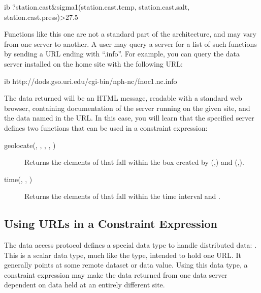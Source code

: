 \begin{vcode}{ib}
?station.cast&sigma1(station.cast.temp,
                     station.cast.salt,
                     station.cast.press)>27.5
\end{vcode}

 
  
 
Functions like this one are not a standard part of the \opendap
architecture, and may vary from one server to another.  A user may
query a server for a list of such functions by sending a URL ending with
``.info''. For example, you can query the data server installed on the
\opendap home site with the following URL:

\begin{vcode}{ib}
  http://dods.gso.uri.edu/cgi-bin/nph-nc/fnoc1.nc.info
\end{vcode}
\label{opd-client,usage}

The data returned will be an HTML message, readable with a standard
web browser, containing documentation of the server running on the
given site, and the data named in the URL.  In this case, you will
learn that the specified server defines two functions that can be used
in a constraint expression: 

\begin{description}
\item[geolocate(, , , ,
  )]
 Returns the elements of  that fall
  within the box created by (,) and
  (,).
\item[time(, , )]
  Returns the elements of  that fall within the time
  interval  and .
\end{description}

\subsection{Using URLs in a Constraint Expression}
\label{opd-client,CE,url}

 
The \opendap data access protocol defines a special data type to handle
distributed data: . This is a scalar data type, much like
the  type, intended to hold one \opendap URL.  It generally
points at some remote dataset or data value. Using this data type, a
constraint expression may make the data returned from one \opendap data
server dependent on data held at an entirely different site.

